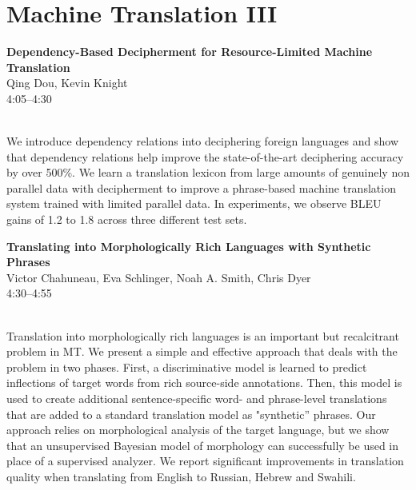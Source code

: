\documentclass[twoside,makeidx]{book}
\begin{document}
\section{Machine Translation III}
\vspace{-1em}
\par\vspace{2em}\noindent%
\begin{minipage}{\linewidth}%
\begin{center}
\textbf{\normalsize Dependency-Based Decipherment for Resource-Limited Machine Translation}\\
\normalsize  Qing Dou,  Kevin Knight\\
{\small 4:05--4:30}\\
\end{center}
\end{minipage}\\[0.5em]
\nopagebreak%
\noindent%
{\small We introduce dependency relations into deciphering foreign languages and show that dependency relations help improve the state-of-the-art deciphering accuracy by over 500\%. We learn a translation lexicon from large amounts of genuinely non parallel data with decipherment to improve a phrase-based machine translation system trained with limited parallel data. In experiments, we observe BLEU gains of 1.2 to 1.8 across three different test sets.}
\par\vspace{2em}\noindent%
\begin{minipage}{\linewidth}%
\begin{center}
\textbf{\normalsize Translating into Morphologically Rich Languages with Synthetic Phrases}\\
\normalsize  Victor Chahuneau,  Eva Schlinger,  Noah A. Smith,  Chris Dyer\\
{\small 4:30--4:55}\\
\end{center}
\end{minipage}\\[0.5em]
\nopagebreak%
\noindent%
{\small Translation into morphologically rich languages is an important but recalcitrant problem in MT. We present a simple and effective approach that deals with the problem in two phases. First, a discriminative model is learned to predict inflections of target words from rich source-side annotations. Then, this model is used to create additional sentence-specific word- and phrase-level translations that are added to a standard translation model as "synthetic'' phrases. Our approach relies on morphological analysis of the target language, but we show that an unsupervised Bayesian model of morphology can successfully be used in place of a supervised analyzer. We report significant improvements in translation quality when translating from English to Russian, Hebrew and Swahili.}
\end{document}
